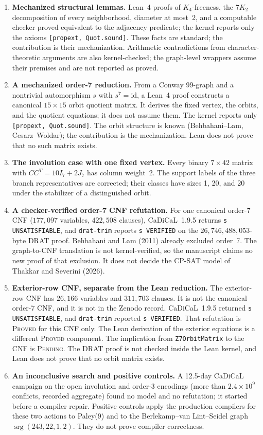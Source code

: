 \documentclass[10pt,a4paper]{article}
\begin{document}
\begin{enumerate}[leftmargin=1.5em, itemsep=0.75pt, topsep=0.75pt]
  \item \textbf{Mechanized structural lemmas.} Lean~4 proofs of $K_4$-freeness, the $7K_2$ decomposition of every neighborhood, diameter at most~2, and a computable checker proved equivalent to the adjacency predicate; the kernel reports only the axioms \texttt{[propext, Quot.sound]}. These facts are standard; the contribution is their mechanization. Arithmetic contradictions from character-theoretic arguments are also kernel-checked; the graph-level wrappers assume their premises and are not reported as proved.
  \item \textbf{A mechanized order-7 reduction.} From a Conway 99-graph and a nontrivial automorphism $s$ with $s^7 = \mathrm{id}$, a Lean~4 proof constructs a canonical $15 \times 15$ orbit quotient matrix. It derives the fixed vertex, the orbits, and the quotient equations; it does not assume them. The kernel reports only \texttt{[propext, Quot.sound]}. The orbit structure is known (Behbahani--Lam, Cesarz--Woldar); the contribution is the mechanization. Lean does not prove that no such matrix exists.
  \item \textbf{The involution case with one fixed vertex.} Every binary $7\times 42$ matrix with $CC^T = 10I_7 + 2J_7$ has column weight~2. The support labels of the three branch representatives are corrected; their classes have sizes 1, 20, and 20 under the stabilizer of a distinguished orbit.
  \item \textbf{A checker-verified order-7 CNF refutation.} For one canonical order-7 CNF ($177{,}097$ variables, $422{,}508$ clauses), CaDiCaL~1.9.5 returns \texttt{s UNSATISFIABLE}, and \texttt{drat-trim} reports \texttt{s VERIFIED} on the $26{,}746{,}488{,}053$-byte DRAT proof. Behbahani and Lam (2011) already excluded order~7. The graph-to-CNF translation is not kernel-verified, so the manuscript claims no new proof of that exclusion. It does not decide the CP-SAT model of Thakkar and Severini (2026).
  \item \textbf{Exterior-row CNF, separate from the Lean reduction.} The exterior-row CNF has $26{,}166$ variables and $311{,}703$ clauses. It is not the canonical order-7 CNF, and it is not in the Zenodo record. CaDiCaL~1.9.5 returned \texttt{s UNSATISFIABLE}, and \texttt{drat-trim} reported \texttt{s VERIFIED}. That refutation is \textsc{Proved} for this CNF only. The Lean derivation of the exterior equations is a different \textsc{Proved} component. The implication from \texttt{Z7OrbitMatrix} to the CNF is \textsc{Pending}. The DRAT proof is not checked inside the Lean kernel, and Lean does not prove that no orbit matrix exists.
  \item \textbf{An inconclusive search and positive controls.} A 12.5-day CaDiCaL campaign on the open involution and order-3 encodings (more than $2.4 \times 10^9$ conflicts, recorded aggregate) found no model and no refutation; it started before a compiler repair. Positive controls apply the production compilers for these two actions to Paley(9) and to the Berlekamp--van Lint--Seidel graph $\operatorname{srg}(243,22,1,2)$. They do not prove compiler correctness.
\end{enumerate}
\end{document}

